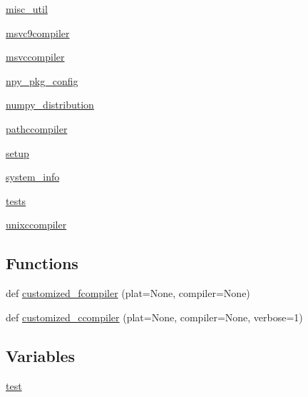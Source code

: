 \begin{DoxyCompactItemize}
 \hyperlink{namespacenumpy_1_1distutils_1_1misc__util}{misc\+\_\+util}
\item 
 \hyperlink{namespacenumpy_1_1distutils_1_1msvc9compiler}{msvc9compiler}
\item 
 \hyperlink{namespacenumpy_1_1distutils_1_1msvccompiler}{msvccompiler}
\item 
 \hyperlink{namespacenumpy_1_1distutils_1_1npy__pkg__config}{npy\+\_\+pkg\+\_\+config}
\item 
 \hyperlink{namespacenumpy_1_1distutils_1_1numpy__distribution}{numpy\+\_\+distribution}
\item 
 \hyperlink{namespacenumpy_1_1distutils_1_1pathccompiler}{pathccompiler}
\item 
 \hyperlink{namespacenumpy_1_1distutils_1_1setup}{setup}
\item 
 \hyperlink{namespacenumpy_1_1distutils_1_1system__info}{system\+\_\+info}
\item 
 \hyperlink{namespacenumpy_1_1distutils_1_1tests}{tests}
\item 
 \hyperlink{namespacenumpy_1_1distutils_1_1unixccompiler}{unixccompiler}
\end{DoxyCompactItemize}
\subsection*{Functions}
\begin{DoxyCompactItemize}
\item 
def \hyperlink{namespacenumpy_1_1distutils_a945ab1b3b10166278586b04b5a002a83}{customized\+\_\+fcompiler} (plat=None, compiler=None)
\item 
def \hyperlink{namespacenumpy_1_1distutils_a1bee492d455b35c6ca27a579ef52dcf3}{customized\+\_\+ccompiler} (plat=None, compiler=None, verbose=1)
\end{DoxyCompactItemize}
\subsection*{Variables}
\begin{DoxyCompactItemize}
\item 
\hyperlink{namespacenumpy_1_1distutils_acf3248fe3702808ca87d87611d278469}{test}
\end{DoxyCompactItemize}


